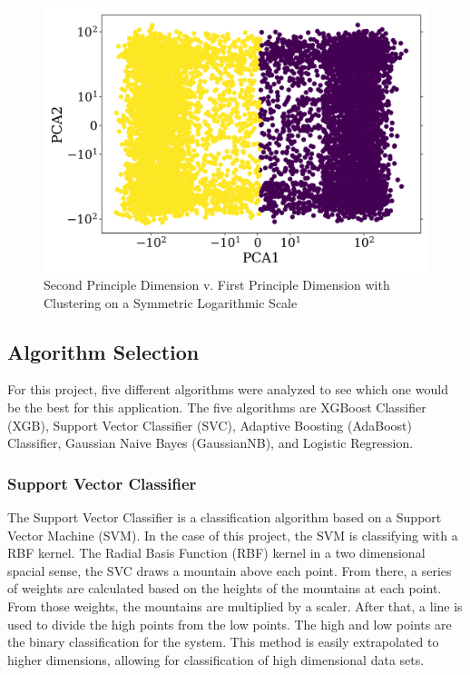 \documentclass{article}
\begin{document}
\begin{figure}[H]
\centering
\includegraphics[scale=0.59]{supporting_images/SecondCluster.png}%
\caption{Second Principle Dimension v. First Principle Dimension with Clustering on a Symmetric Logarithmic Scale}
\label{fig:SecondCluster}
\end{figure}

\subsection{Algorithm Selection} \label{algorithm_selection}
\par
For this project, five different algorithms were analyzed to see which one would be the best for this application. The five algorithms are XGBoost Classifier (XGB), Support Vector Classifier (SVC), Adaptive Boosting (AdaBoost) Classifier, Gaussian Naive Bayes (GaussianNB), and Logistic Regression. 

\subsubsection{Support Vector Classifier}
\par
The Support Vector Classifier is a classification algorithm based on a Support Vector Machine (SVM). In the case of this project, the SVM is classifying with a RBF kernel. The Radial Basis Function (RBF) kernel in a two dimensional spacial sense, the SVC draws a mountain above each point. From there, a series of weights are calculated based on the heights of the mountains at each point. From those weights, the mountains are multiplied by a scaler. After that, a line is used to divide the high points from the low points. The high and low points are the binary classification for the system. This method is easily extrapolated to higher dimensions, allowing for classification of high dimensional data sets.
\end{document}

